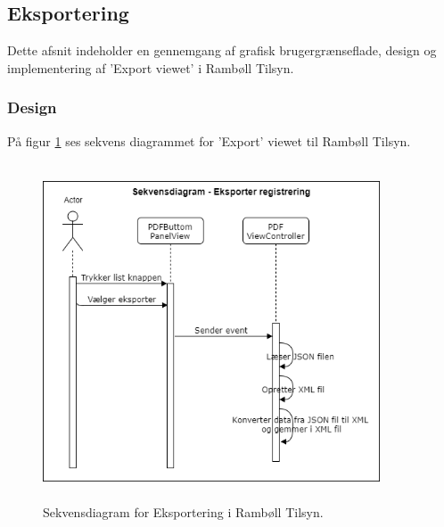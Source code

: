 \subsection{Eksportering} \label{sec:Eksport}
Dette afsnit indeholder en gennemgang af grafisk brugergrænseflade, design og implementering af 'Export viewet' i Rambøll Tilsyn.

\subsubsection{Design}
På figur \ref{fig:EksporterSekvensDiagram} ses sekvens diagrammet for 'Export' viewet til Rambøll Tilsyn.
\begin{figure}[H] %
	\centering
	\includegraphics[height=10cm, width=10cm]{../ArkitekturDesign/Design/Eksportering/EksporterSekvensDiagram}
	\caption{Sekvensdiagram for Eksportering i Rambøll Tilsyn.}
	\label{fig:EksporterSekvensDiagram}
\end{figure}

\clearpage

